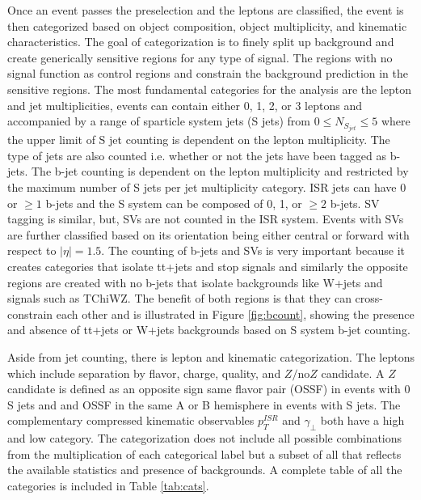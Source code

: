 Once an event passes the preselection and the leptons are classified, the event is then categorized based on object composition, object multiplicity, and kinematic characteristics. The goal of categorization is to finely split up background and create generically sensitive regions for any type of signal. The regions with no signal function as control regions and constrain the background prediction in the sensitive regions. The most fundamental categories for the analysis are the lepton and jet multiplicities, events can contain either 0, 1, 2, or 3 leptons and accompanied by a range of sparticle system jets (S jets) from $0\leq N_{S_{jet}} \leq 5$ where the upper limit of S jet counting is dependent on the lepton multiplicity. The type of jets are also counted i.e. whether or not the jets have been tagged as b-jets. The b-jet counting is dependent on the lepton multiplicity and restricted by the maximum number of S jets per jet multiplicity category.  ISR jets can have 0 or $\geq 1$ b-jets and the S system can be composed of 0, 1, or $\geq2$ b-jets. SV tagging is similar, but, SVs are not counted in the ISR system. Events with SVs are further classified based on its orientation being either central or forward with respect to $|\eta|=1.5$. The counting of b-jets and SVs is very important because it creates categories that isolate tt+jets and stop signals and similarly the opposite regions are created with no b-jets that isolate backgrounds like W+jets and signals such as TChiWZ. The benefit of both regions is that they can cross-constrain each other and is illustrated in Figure \ref{fig:bcount}, showing the presence and absence of tt+jets or W+jets backgrounds based on S system b-jet counting.

Aside from jet counting, there is lepton and kinematic categorization. The leptons which include separation by flavor, charge, quality, and $Z/\text{no} Z$ candidate.  A $Z$ candidate is defined as an opposite sign same flavor pair (OSSF) in events with 0 S jets and and OSSF in the same A or B hemisphere in events with S jets. The complementary compressed kinematic observables $p_T^{ISR}$ and $\gamma_\perp$ both have a high and low category.  The categorization does not include all possible combinations from the multiplication of each categorical label but a subset of all that reflects the available statistics and presence of backgrounds. A complete table of all the categories is included in Table \ref{tab:cats}. 

